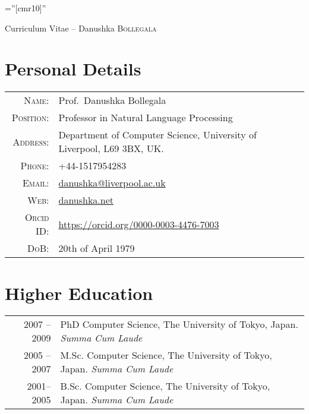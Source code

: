 \documentclass[a4paper,11pt]{article}
\begin{document}

\font\fb=''[cmr10]'' %

\par{\centering
		{\Large Curriculum Vitae -- Danushka \textsc{Bollegala}
	}\bigskip\par}

\section{Personal Details}

\begin{tabular}{rl}
    \textsc{Name:} & Prof.~Danushka Bollegala\\
    \textsc{Position:} & Professor in Natural Language Processing\\
    \textsc{Address:}   & Department of Computer Science, University of Liverpool, L69 3BX, UK. \\
    \textsc{Phone:}     & +44-1517954283\\
    \textsc{Email:}     & \href{mailto:danushka@liverpool.ac.uk}{danushka@liverpool.ac.uk} \\
    \textsc{Web:} & \href{http://danushka.net}{danushka.net} \\
    \textsc{Orcid ID:} & \url{https://orcid.org/0000-0003-4476-7003}\\
    \textsc{DoB:}  & 20th of April 1979
\end{tabular}


\section{Higher Education}
\begin{tabular}{r|p{10cm}}
\textsc{2007 -- 2009} & PhD Computer Science, The University of Tokyo, Japan.  \emph{Summa Cum Laude} \\
\textsc{2005 -- 2007} & M.Sc. Computer Science, The University of Tokyo, Japan. \emph{Summa Cum Laude} \\
\textsc{2001-- 2005} & B.Sc. Computer Science, The University of Tokyo, Japan. \emph{Summa Cum Laude} \\
\end{tabular}
\end{document}

